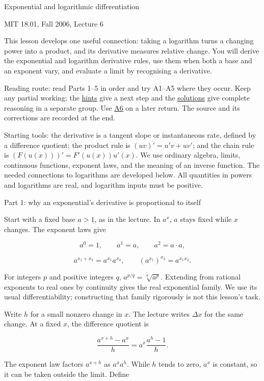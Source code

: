 \documentclass[
  11pt,
]{article}
\author{}
\date{}
\providecommand{\gt}{>}
\begin{document}
Exponential and logarithmic differentiation

MIT 18.01, Fall 2006, Lecture 6

This lesson develops one useful connection: taking a logarithm turns a
changing power into a product, and its derivative measures relative
change. You will derive the exponential and logarithm derivative rules,
use them when both a base and an exponent vary, and evaluate a limit by
recognising a derivative.

Reading route: read Parts 1--5 in order and try A1--A5 where they occur.
Keep any partial working; the \protect\hyperlink{hints}{hints} give a
next step and the \protect\hyperlink{solutions}{solutions} give complete
reasoning in a separate group. Use \protect\hyperlink{task-a6}{A6} on a
later return. The source and its corrections are recorded at the end.

Starting tools: the derivative is a tangent slope or instantaneous rate,
defined by a difference quotient; the product rule is \((uv)'=u'v+uv'\);
and the chain rule is \((F(u(x)))'=F'(u(x))u'(x)\). We use ordinary
algebra, limits, continuous functions, exponent laws, and the meaning of
an inverse function. The needed connections to logarithms are developed
below. All quantities in powers and logarithms are real, and logarithm
inputs must be positive.

Part 1: why an exponential's derivative is proportional to itself

Start with a fixed base \(a\gt 1\), as in the lecture. In \(a^x\), \(a\)
stays fixed while \(x\) changes. The exponent laws give

\[
a^0=1,\qquad a^1=a,\qquad a^2=a\cdot a,
\]

\[
a^{x_1+x_2}=a^{x_1}a^{x_2},\qquad (a^{x_1})^{x_2}=a^{x_1x_2}.
\]

For integers \(p\) and positive integers \(q\),
\(a^{p/q}=\sqrt[q]{a^p}\). Extending from rational exponents to real
ones by continuity gives the real exponential family. We use its usual
differentiability; constructing that family rigorously is not this
lesson's task.

Write \(h\) for a small nonzero change in \(x\). The lecture writes
\(\Delta x\) for the same change. At a fixed \(x\), the difference
quotient is

\[
\frac{a^{x+h}-a^x}{h}
=a^x\frac{a^h-1}{h}.
\]

The exponent law factors \(a^{x+h}\) as \(a^xa^h\). While \(h\) tends to
zero, \(a^x\) is constant, so it can be taken outside the limit. Define
\end{document}
